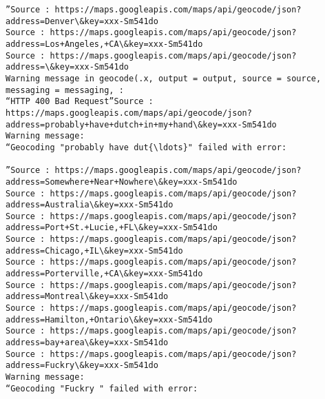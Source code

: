 \documentclass[11pt]{article}
\begin{document}
\begin{Verbatim}[commandchars=\\\{\}]
”Source : https://maps.googleapis.com/maps/api/geocode/json?address=Denver\&key=xxx-Sm541do
Source : https://maps.googleapis.com/maps/api/geocode/json?address=Los+Angeles,+CA\&key=xxx-Sm541do
Source : https://maps.googleapis.com/maps/api/geocode/json?address=\&key=xxx-Sm541do
Warning message in geocode(.x, output = output, source = source, messaging = messaging, :
“HTTP 400 Bad Request”Source : https://maps.googleapis.com/maps/api/geocode/json?address=probably+have+dutch+in+my+hand\&key=xxx-Sm541do
Warning message:
“Geocoding "probably have dut{\ldots}" failed with error:

”Source : https://maps.googleapis.com/maps/api/geocode/json?address=Somewhere+Near+Nowhere\&key=xxx-Sm541do
Source : https://maps.googleapis.com/maps/api/geocode/json?address=Australia\&key=xxx-Sm541do
Source : https://maps.googleapis.com/maps/api/geocode/json?address=Port+St.+Lucie,+FL\&key=xxx-Sm541do
Source : https://maps.googleapis.com/maps/api/geocode/json?address=Chicago,+IL\&key=xxx-Sm541do
Source : https://maps.googleapis.com/maps/api/geocode/json?address=Porterville,+CA\&key=xxx-Sm541do
Source : https://maps.googleapis.com/maps/api/geocode/json?address=Montreal\&key=xxx-Sm541do
Source : https://maps.googleapis.com/maps/api/geocode/json?address=Hamilton,+Ontario\&key=xxx-Sm541do
Source : https://maps.googleapis.com/maps/api/geocode/json?address=bay+area\&key=xxx-Sm541do
Source : https://maps.googleapis.com/maps/api/geocode/json?address=Fuckry\&key=xxx-Sm541do
Warning message:
“Geocoding "Fuckry " failed with error:


\end{Verbatim}
\end{document}
